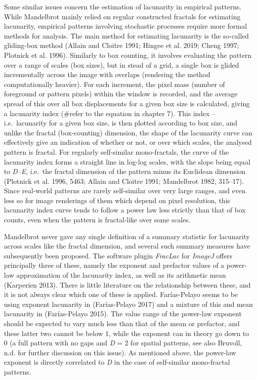 \documentclass[
  12pt,
  a4paper, twoside]{book}
\begin{document}
Some similar issues concern the estimation of lacunarity in empirical patterns. While Mandelbrot mainly relied on regular constructed fractals for estimating lacunarity, empirical patterns involving stochastic processes require more formal methods for analysis. The main method for estimating lacunarity is the so-called gliding-box method (Allain and Cloitre 1991; Hingee et al. 2019; Cheng 1997; Plotnick et al. 1996). Similarly to box counting, it involves evaluating the pattern over a range of scales (box sizes), but in stead of a grid, a single box is glided incrementally across the image with overlaps (rendering the method computationally heavier). For each increment, the pixel mass (number of foreground or pattern pixels) within the window is recorded, and the average spread of this over all box displacements for a given box size is calculated, giving a lacunarity index (\#refer to the equation in chapter 7). This index -- i.e.~lacunarity for a given box size, is then plotted according to box size, and unlike the fractal (box-counting) dimension, the shape of the lacunarity curve can effectively give an indication of whether or not, or over which scales, the analysed pattern is fractal. For regularly self-similar mono-fractals, the curve of the lacunarity index forms a straight line in log-log scales, with the slope being equal to \emph{D--E}, i.e.~the fractal dimension of the pattern minus its Euclidean dimension (Plotnick et al. 1996, 5463; Allain and Cloitre 1991; Mandelbrot 1982, 315--17). Since real-world patterns are rarely self-similar over very large ranges, and even less so for image renderings of them which depend on pixel resolution, this lacunarity index curve tends to follow a power law less strictly than that of box counts, even when the pattern is fractal-like over some scales.

Mandelbrot never gave any single definition of a summary statistic for lacunarity across scales like the fractal dimension, and several such summary measures have subsequently been proposed. The software plugin \emph{FracLac} for \emph{ImageJ} offers principally three of these, namely the exponent and prefactor values of a power-law approximation of the lacunarity index, as well as its arithmetic mean (Karperien 2013). There is little literature on the relationship between these, and it is not always clear which one of these is applied. Farías-Pelayo seems to be using exponent lacunarity in (Farías-Pelayo 2017) and a mixture of this and mean lacunarity in (Farías-Pelayo 2015). The value range of the power-law exponent should be expected to vary much less than that of the mean or prefactor, and these latter two cannot be below 1, while the exponent can in theory go down to 0 (a full pattern with no gaps and \emph{D} = 2 for spatial patterns, see also Bruvoll, n.d. for further discussion on this issue). As mentioned above, the power-law exponent is directly correlated to \emph{D} in the case of self-similar mono-fractal patterns.
\end{document}
